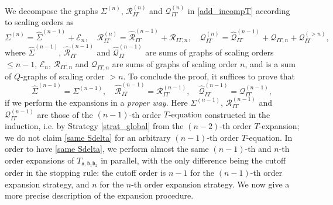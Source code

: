 \documentclass{article}
\newcommand{\1}{\mathds{1}}
\numberwithin{equation}{section}
\newcommand{\be}{\begin{equation}}
\newcommand{\ee}{\end{equation}}
\newcommand{\fa}{{\mathfrak a}}
\newcommand{\fb}{{\mathfrak b}}
\renewcommand{\cal}{\mathcal}
\newcommand{\wh}{\widehat}
\renewcommand{\leq}{\leqslant}
\renewcommand{\le}{\leq}
\theoremstyle{plain} %
\theoremstyle{remark}
\newcommand{\Sdelta}{{\Sigma}_T}
\newcommand{\wtSdelta}{\Sigma}
\newcommand{\wtSdeltan}{\Sigma^{(n)}}
\newcommand{\wtSdeltak}{\Sigma^{(k)}}
\newcommand{\Sele}{{\mathcal E}}
\newcommand{\incomp}{{\text{$T$-equation}}}
\newcommand{\PIT}{\mathcal R_{IT}}
\newcommand{\whPIT}{\widehat{\mathcal R}_{IT}}
\newcommand{\QIT}{\mathcal Q_{IT}}
\newcommand{\whQIT}{\widehat{\mathcal Q}_{IT}}
\begin{document}
We decompose the graphs $\wtSdeltan$, $\PIT^{(n)}$ and $\QIT^{(n)}$ in \eqref{add_incompT} according to scaling orders as  
\be\label{same Sdelta0}\wtSdeltan=\wh\wtSdelta^{(n-1)}+ \Sele_{n},\quad \PIT^{(n)} = \whPIT^{(n-1)} + \cal R_{IT,n} ,\quad  \QIT^{(n)} = \whQIT^{(n-1)} +  \cal Q_{IT,n} + \QIT^{(>n)}, \ee
where $\wh\wtSdelta^{(n-1)}$, $\whPIT^{(n-1)}$ and $\whQIT^{(n-1)}$ are sums of graphs of scaling orders $\le n-1$, $ \Sele_{n}$, $\cal R_{IT,n}$ and $\cal Q_{IT,n}$ are sums of graphs of scaling order $n$, and \smash{$\QIT^{(>n)}$} is a sum of $Q$-graphs of scaling order $>n$. To conclude the proof, it suffices to prove that %
\be\label{same Sdelta} 
\wh\wtSdelta^{(n-1)}= \wtSdelta^{(n-1)} ,\quad \whPIT^{(n-1)}=\PIT^{(n-1)},\quad \whQIT^{(n-1)}=\QIT^{(n-1)}, %
\ee
if we perform the expansions in a \emph{proper way}. Here $\wtSdelta^{(n-1)}$, $\PIT^{(n-1)}$ and $\QIT^{(n-1)}$ are those of the $(n-1)$-th order $\incomp$ constructed in the induction, i.e. by Strategy \ref{strat_global} from the $(n-2)$-th order $T$-expansion; we do not claim \eqref{same Sdelta} for an arbitrary $(n-1)$-th order $\incomp$. %
In order to have \eqref{same Sdelta}, we perform almost the same $(n-1)$-th and $n$-th order expansions of $T_{\fa,\fb_1 \fb_2}$ in parallel, with the only difference being the cutoff order in the stopping rule: the cutoff order is $n-1$ for the $(n-1)$-th order expansion strategy, and $n$ for the $n$-th order expansion strategy. We now give a more precise description of the expansion procedure. 
\end{document}
